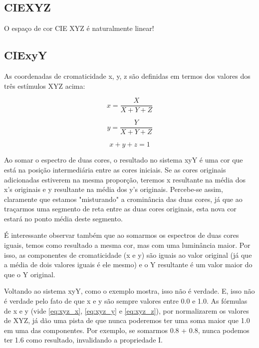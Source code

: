 \documentclass[a4paper,10pt]{report}
\begin{document}
\subsection{CIEXYZ}
\par
O espaço de cor CIE XYZ é naturalmente linear!

\subsection{CIExyY}
As coordenadas de cromaticidade x, y, z são definidas em termos dos valores
dos três estímulos XYZ acima:

\begin{equation}\label{eq:xyz_x}
x=\frac{X}{X+Y+Z}
\end{equation}

\begin{equation}\label{eq:xyz_y}
y=\frac{Y}{X+Y+Z}
\end{equation}

\begin{equation}\label{eq:xyz_z}
x+y+z=1
\end{equation}

\par
Ao somar o espectro de duas cores, o resultado no sistema xyY é uma cor que está
na posição intermediária entre as cores iniciais. Se as cores originais
adicionadas estiverem na mesma proporção, teremos x resultante na média dos x's
originais e y resultante na média dos y's originais. Percebe-se assim,
claramente que estamos "misturando" a crominância das duas cores, já que ao
traçarmos uma segmento de reta entre as duas cores originais, esta nova cor
estará no ponto média deste segmento.

\par
É interessante observar também que ao somarmos os espectros de duas cores
iguais, temos como resultado a mesma cor, mas com uma luminância maior. Por
isso, as componentes de cromaticidade (x e y) são iguais ao valor original (já
que a média de dois valores iguais é ele mesmo) e o Y resultante é um valor
maior do que o Y original.

\par
Voltando ao sistema xyY, como o exemplo mostra, isso não é verdade. E, isso não
é verdade pelo fato de que x e y são sempre valores entre 0.0 e 1.0. As fórmulas
de x e y (vide \ref{eq:xyz_x}, \ref{eq:xyz_y} e \ref{eq:xyz_z}), por
normalizarem os valores de XYZ, já dão uma pista de que nunca poderemos ter
uma soma maior que 1.0 em uma das componentes. Por exemplo, se somarmos 0.8 +
0.8, nunca podemos ter 1.6 como resultado, invalidando a propriedade I.
\end{document}
